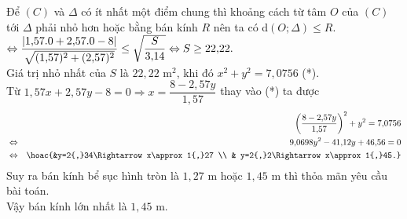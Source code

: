 \begin{bt}
{\begin{center}
		\end{center}
		Để $(C) $ và $\Delta $ có ít nhất một điểm chung thì khoảng cách từ tâm $O$ của $(C)$ tới $\Delta $ phải nhỏ hơn hoặc bằng bán kính $R$ nên ta có d$(O;\Delta)\le R$.\\
		$\Leftrightarrow \dfrac{\left| 1{,}57.0+2{,}57.0-8 \right|}{\sqrt{(1{,}57)^2+(2{,}57)^2}}\le \sqrt{\dfrac{S}{3{,}14}} \\ 
		\Leftrightarrow S\ge 22{,}22.$\\
		Giá trị nhỏ nhất của $S$ là $22{,}22\text{ m}^2$, khi đó $x^2+y^2=7{,}0756$ (*). \\
		Từ $1{,}57x+2{,}57y-8=0\Rightarrow x=\dfrac{8-2{,}57y}{1{,}57}$ thay vào (*) ta được
		\begin{eqnarray*}
			&& \left(\dfrac{8-2{,}57y}{1{,}57} \right)^2+y^2=7{,}0756 \\ 
			& \Leftrightarrow& 9{,}0698y^2-41{,}12y+46{,}56=0 \\ 
			& \Leftrightarrow& \hoac{&y=2{,}34\Rightarrow x\approx 1{,}27 \\ 
				& y=2{,}2\Rightarrow x\approx 1{,}45.}
		\end{eqnarray*}
		Suy ra bán kính bể sục hình tròn là $1{,}27$ m hoặc $1{,}45$ m thì thỏa mãn yêu cầu bài toán.\\
		Vậy bán kính lớn nhất là $1{,}45$ m. 
	}
\end{bt}


